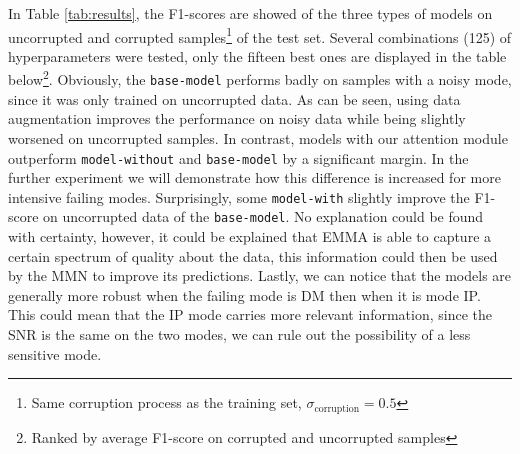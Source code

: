 In Table \ref{tab:results}, the F1-scores are showed of the three types of models on uncorrupted and corrupted samples\footnote{Same corruption process as the training set, $\sigma_{\text{corruption}} = 0.5$} of the test set. Several combinations (125) of hyperparameters were tested, only the fifteen best ones are displayed in the table below\footnote{Ranked by average F1-score on corrupted and uncorrupted samples}. Obviously, the \texttt{base-model} performs badly on samples with a noisy mode, since it was only trained on uncorrupted data. As can be seen, using data augmentation improves the performance on noisy data while being slightly worsened on uncorrupted samples. In contrast, models with our attention module outperform \texttt{model-without} and \texttt{base-model} by a significant margin. In the further experiment we will demonstrate how this difference is increased for more intensive failing modes. Surprisingly, some \texttt{model-with} slightly improve the F1-score on uncorrupted data of the \texttt{base-model}. No explanation could be found with certainty, however, it could be explained that EMMA is able to capture a certain spectrum of quality about the data, this information could then be used by the MMN to improve its predictions. Lastly, we can notice that the models are generally more robust when the failing mode is DM then when it is mode IP. This could mean that the IP mode carries more relevant information, since the SNR is the same on the two modes, we can rule out the possibility of a less sensitive mode.
